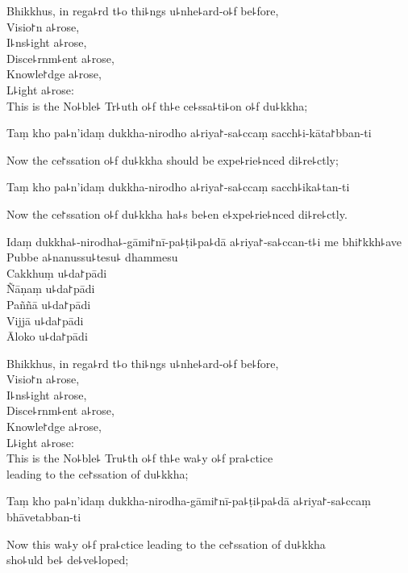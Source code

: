 \begin{english}
  Bhikkhus, in rega꜕rd t꜕o thi꜕ngs u꜕nhe꜕ard-o꜕f be꜕fore,\\
  Visio꜓n a꜕rose,\\
  I꜕ns꜕ight a꜕rose,\\
  Disce꜕rnm꜕ent a꜕rose,\\
  Knowle꜓dge a꜕rose,\\
  L꜕ight a꜕rose:\\
  This is the No꜕ble꜕ Tr꜕uth o꜕f th꜕e ce꜕ssa꜕ti꜕on o꜕f du꜕kkha;
\end{english}

Taṃ kho pa꜕n'idaṃ dukkha-nirodho a꜕riya꜓-sa꜕ccaṃ sacch꜕i-kāta꜓bban-ti

\begin{english}
  Now the ce꜓ssation o꜕f du꜕kkha should be expe꜕rie꜕nced di꜕re꜕ctly;
\end{english}

Taṃ kho pa꜕n'idaṃ dukkha-nirodho a꜕riya꜓-sa꜕ccaṃ sacch꜕ika꜕tan-ti

\begin{english}
  Now the ce꜓ssation o꜕f du꜕kkha ha꜕s be꜕en e꜕xpe꜕rie꜕nced di꜕re꜕ctly.
\end{english}

Idaṃ dukkha꜕-nirodha꜕-gāmi꜓nī-pa꜕ṭi꜕pa꜕dā a꜕riya꜓-sa꜕ccan-t꜕i me bhi꜓kkh꜕ave\\
Pubbe a꜕nanussu꜕tesu꜕ dhammesu\\
Cakkhuṃ u꜕da꜓pādi\\
Ñāṇaṃ u꜕da꜓pādi\\
Paññā u꜕da꜓pādi\\
Vijjā u꜕da꜓pādi\\
Āloko u꜕da꜓pādi

\begin{english}
  Bhikkhus, in rega꜕rd t꜕o thi꜕ngs u꜕nhe꜕ard-o꜕f be꜕fore,\\
  Visio꜓n a꜕rose,\\
  I꜕ns꜕ight a꜕rose,\\
  Disce꜕rnm꜕ent a꜕rose,\\
  Knowle꜓dge a꜕rose,\\
  L꜕ight a꜕rose:\\
  This is the No꜕ble꜕ Tru꜕th o꜕f th꜕e wa꜕y o꜕f pra꜕ctice\\
  leading to the ce꜓ssation of du꜕kkha;
\end{english}

Taṃ kho pa꜕n'idaṃ dukkha-nirodha-gāmi꜓nī-pa꜕ṭi꜕pa꜕dā a꜕riya꜓-sa꜕ccaṃ bhāvetabban-ti

\begin{english}
  Now this wa꜕y o꜕f pra꜕ctice leading to the ce꜓ssation of du꜕kkha\\
  sho꜕uld be꜕ de꜕ve꜕loped;
\end{english}

